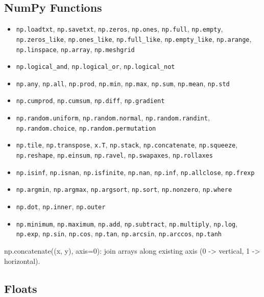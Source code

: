 \documentclass{article}
\begin{document}
\subsection*{NumPy Functions}
\begin{itemize}
    \item \texttt{np.loadtxt}, \texttt{np.savetxt}, \texttt{np.zeros}, \texttt{np.ones}, \texttt{np.full}, \texttt{np.empty}, \texttt{np.zeros\_like}, \texttt{np.ones\_like}, \texttt{np.full\_like}, \texttt{np.empty\_like}, \texttt{np.arange}, \texttt{np.linspace}, \texttt{np.array}, \texttt{np.meshgrid}
    \item \texttt{np.logical\_and}, \texttt{np.logical\_or}, \texttt{np.logical\_not}
    \item \texttt{np.any}, \texttt{np.all}, \texttt{np.prod}, \texttt{np.min}, \texttt{np.max}, \texttt{np.sum}, \texttt{np.mean}, \texttt{np.std}
    \item \texttt{np.cumprod}, \texttt{np.cumsum}, \texttt{np.diff}, \texttt{np.gradient}
    \item \texttt{np.random.uniform}, \texttt{np.random.normal}, \texttt{np.random.randint}, \texttt{np.random.choice}, \texttt{np.random.permutation}
    \item \texttt{np.tile}, \texttt{np.transpose}, \texttt{x.T}, \texttt{np.stack}, \texttt{np.concatenate}, \texttt{np.squeeze}, \texttt{np.reshape}, \texttt{np.einsum}, \texttt{np.ravel}, \texttt{np.swapaxes}, \texttt{np.rollaxes}
    \item \texttt{np.isinf}, \texttt{np.isnan}, \texttt{np.isfinite}, \texttt{np.nan}, \texttt{np.inf}, \texttt{np.allclose}, \texttt{np.frexp}
    \item \texttt{np.argmin}, \texttt{np.argmax}, \texttt{np.argsort}, \texttt{np.sort}, \texttt{np.nonzero}, \texttt{np.where}
    \item \texttt{np.dot}, \texttt{np.inner}, \texttt{np.outer}
    \item \texttt{np.minimum}, \texttt{np.maximum}, \texttt{np.add}, \texttt{np.subtract}, \texttt{np.multiply}, \texttt{np.log}, \texttt{np.exp}, \texttt{np.sin}, \texttt{np.cos}, \texttt{np.tan}, \texttt{np.arcsin}, \texttt{np.arccos}, \texttt{np.tanh}
\end{itemize}

np.concatenate((x, y), axis=0): join arrays along existing axis (0 -> vertical, 1 -> horizontal).

\subsection*{Floats}
\end{document}

